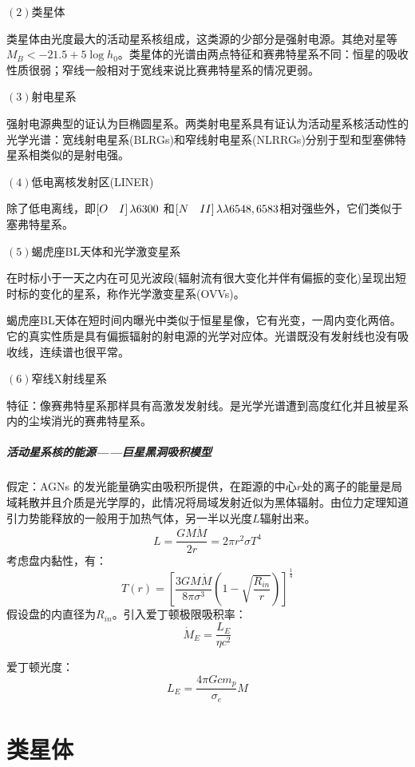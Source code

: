 $\left(2\right)$类星体

类星体由光度最大的活动星系核组成，这类源的少部分是强射电源。其绝对星等$M_{B}<-21.5+5\log h_{0}$。类星体的光谱由两点特征和赛弗特星系不同：恒星的吸收性质很弱；窄线一般相对于宽线来说比赛弗特星系的情况更弱。

$\left(3\right)$射电星系

强射电源典型的证认为巨椭圆星系。两类射电星系具有证认为活动星系核活动性的光学光谱：宽线射电星系(BLRGs)和窄线射电星系(NLRRGs)分别于型和型塞佛特星系相类似的是射电强。

$\left(4\right)$低电离核发射区(LINER)

除了低电离线，即$\left[O\quad \Rmnum{1}\right]\lambda 6300$
和$\left[N\quad\Rmnum{2}\right]\lambda\lambda6548,6583$相对强些外，它们类似于塞弗特星系。

$\left(5\right)$蝎虎座BL天体和光学激变星系

在时标小于一天之内在可见光波段(辐射流有很大变化并伴有偏振的变化)呈现出短时标的变化的星系，称作光学激变星系(OVVs)。

蝎虎座BL天体在短时间内曝光中类似于恒星星像，它有光变，一周内变化两倍。它的真实性质是具有偏振辐射的射电源的光学对应体。光谱既没有发射线也没有吸收线，连续谱也很平常。

$\left(6\right)$窄线X射线星系

特征：像赛弗特星系那样具有高激发发射线。是光学光谱遭到高度红化并且被星系内的尘埃消光的赛弗特星系。
\subparagraph{活动星系核的能源——巨星黑洞吸积模型}
假定：AGNs 的发光能量确实由吸积所提供，在距源的中心$r$处的离子的能量是局域耗散并且介质是光学厚的，此情况将局域发射近似为黑体辐射。由位力定理知道引力势能释放的一般用于加热气体，另一半以光度$L$辐射出来。
\begin{equation}
	L=\frac{GM\dot{M}}{2r}=2\pi r^2\sigma T^4
\end{equation}
考虑盘内黏性，有：
\begin{equation}
	T(r)=\left[\frac{3GM\dot{M}}{8\pi\sigma ^3}\left(1-\sqrt{\frac{R_{in}}{r}}\right)\right]^{\frac{1}{4}}
\end{equation}
假设盘的内直径为$R_{in}$。引入爱丁顿极限吸积率：
\begin{equation}
	\dot{M}_{E}=\frac{L_{E}}{\eta c^2}
\end{equation}

爱丁顿光度：
\begin{equation}
	L_{E}=\frac{4\pi Gcm_{p}}{\sigma_{e}}M
\end{equation}
\section{类星体}
